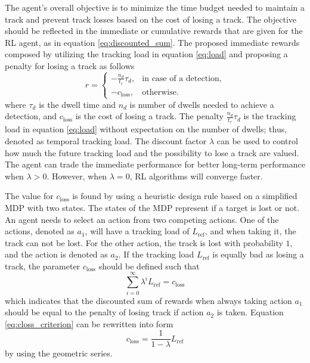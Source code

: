\documentclass[english, 12pt, a4paper, elec, utf8, a-1b, online]{aaltothesis}
\newcommand{\lref}{L_\text{ref}}
\newcommand{\closs}{c_\text{loss}}
\newcommand{\ri}{t_r}
\begin{document}
The agent's overall objective is to minimize the time budget needed to maintain a track and prevent track losses based on the cost of losing a track.
The objective should be reflected in the immediate or cumulative rewards that are given for the RL agent, as in equation \eqref{eq:discounted_sum}. 
The proposed immediate rewards composed by utilizing the tracking load in equation \eqref{eq:load} and proposing a penalty for losing a track as follows
\begin{equation}
    r = \left\{
    \begin{array}{ll}
        -\frac{n_d}{\ri} \tau_d, & \text{in case of a detection,}\\
        -\closs, & \text{otherwise}.
    \end{array} \right.
\end{equation}
where $\tau_d$ is the dwell time and $n_d$ is number of dwells needed to achieve a detection, and $\closs$ is the cost of losing a track.
The penalty $\frac{n_d}{\ri}\tau_d$ is the tracking load in equation \eqref{eq:load} without expectation on the number of dwells; thus, denoted as temporal tracking load.
The discount factor $\lambda$ can be used to control how much the future tracking load and the possibility to lose a track are valued.
The agent can trade the immediate performance for better long-term performance when $\lambda > 0$.
However, when $\lambda = 0$, RL algorithms will converge faster.

The value for $\closs$ is found by using a heuristic design rule based on a simplified MDP with two states.
The states of the MDP represent if a target is lost or not.
An agent needs to select an action from two competing actions.
One of the actions, denoted as $a_1$, will have a tracking load of $\lref$, and when taking it, the track can not be lost.
For the other action, the track is lost with probability $1$, and the action is denoted as $a_2$.
If the tracking load $\lref$ is equally bad as losing a track, the parameter $\closs$ should be defined such that
\begin{equation}\label{eq:closs_criterion}
    \sum_{i=0}^\infty \lambda^i \lref = \closs
\end{equation}
which indicates that the discounted sum of rewards when always taking action $a_1$ should be equal to the penalty of losing track if action $a_2$ is taken.
Equation \eqref{eq:closs_criterion} can be rewritten into form
\begin{equation}
    \closs = \frac{1}{1-\lambda} \lref
\end{equation}
 by using the geometric series.
\end{document}
